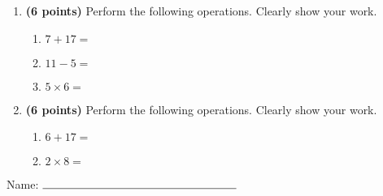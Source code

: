 \documentclass[12pt]{amsart}
\begin{document}
\newpage
\begin{enumerate}
\item {\bf (6 points)} 
 Perform the following operations. Clearly show your work. \begin{enumerate}


\def \a{7}\def \b{17}\def \apb{24}

 
\item $\a + \b = $

\vspace{2cm}
\def \a{11}\def \dif{6}\def \b{5}

 
\item $\a - \b = $

\vspace{2cm}
\def \a{5}\def \b{6}\def \ab{11}

 
\item $\a \times \b = $ 

\vspace{2cm}
\def \vshift{1}\def \hshift{-2}\def \chang{0}\def \findval{-2}\def \yval{1}

 
\end{enumerate}


\newpage
\item {\bf (6 points)} 
 Perform the following operations. Clearly show your work. \begin{enumerate}


\def \a{6}\def \b{17}\def \apb{23}

 
\item $\a + \b = $

\vspace{2cm}
\def \a{2}\def \b{8}\def \ab{10}

 
\item $\a \times \b = $ 

\vspace{2cm}
\def \vshift{-5}\def \hshift{4}\def \chang{2}\def \findval{6}\def \yval{-9}

 
\end{enumerate}


\newpage\end{enumerate}\graphicspath{{C:/Users/iainc/anaconda3/Randomizer/Sample Course/Sample Assessment 2/}}\setcounter{page}{1}


\thispagestyle{fancy}

 
\noindent Name: $\rule{6cm}{0.15mm}$

\vspace{.2cm}
\end{document}
